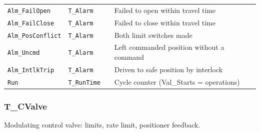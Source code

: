 {\begin{longtable}{@{}>{\raggedright\arraybackslash}p{3.4cm}>{\raggedright\arraybackslash}p{3.3cm}>{\raggedright\arraybackslash}p{1.3cm}>{\raggedright\arraybackslash}p{6.4cm}@{}}
\texttt{Alm\_FailOpen} & \texttt{T\_Alarm} &  & Failed to open within travel time \\
\texttt{Alm\_FailClose} & \texttt{T\_Alarm} &  & Failed to close within travel time \\
\texttt{Alm\_PosConflict} & \texttt{T\_Alarm} &  & Both limit switches made \\
\texttt{Alm\_Uncmd} & \texttt{T\_Alarm} &  & Left commanded position without a command \\
\texttt{Alm\_IntlkTrip} & \texttt{T\_Alarm} &  & Driven to safe position by interlock \\
\texttt{Run} & \texttt{T\_RunTime} &  & Cycle counter (Val\_Starts = operations) \\
\bottomrule
\end{longtable}
}
\subsubsection*{T\_CValve}
\label{app:pclib:tcvalve}
Modulating control valve: limits, rate limit, positioner feedback.

